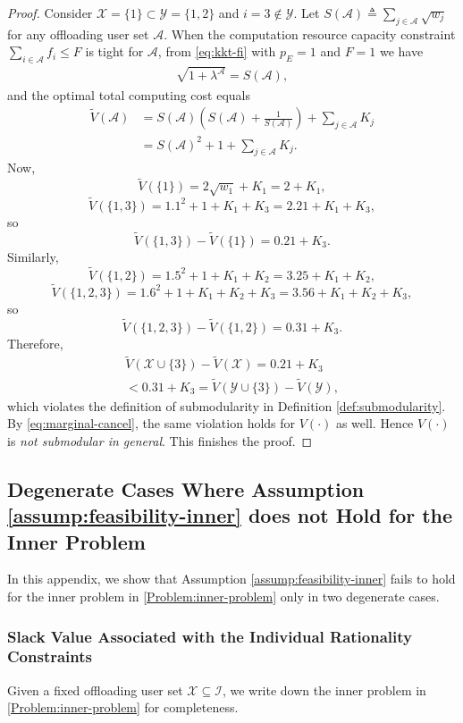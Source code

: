 \documentclass[lettersize,journal]{IEEEtran}
\begin{document}
\begin{proof}
Consider $\mathcal{X}=\{1\}\subset \mathcal{Y}=\{1,2\}$ and $i=3\notin \mathcal{Y}$.
Let $S(\mathcal{A})\triangleq \sum_{j\in\mathcal{A}}\sqrt{w_j}$ for any offloading user set $\mathcal{A}$.
When the computation resource capacity constraint $\sum_{i\in\mathcal{A}}f_i\le F$ is tight for $\mathcal{A}$, from \eqref{eq:kkt-fi} with $p_E=1$ and $F=1$ we have
\begin{align}
\sqrt{1+\lambda^{\mathcal{A}}}=S(\mathcal{A}),
\label{eq:lambda-tight}
\end{align}
and the optimal total computing cost equals
\begin{align}
\widetilde V(\mathcal{A})
&=
S(\mathcal{A})
\left(
S(\mathcal{A})+\frac{1}{S(\mathcal{A})}
\right)+\sum_{j\in\mathcal{A}}K_j\nonumber\\
&=
S(\mathcal{A})^2+1+\sum_{j\in\mathcal{A}}K_j.
\label{eq:tildeV-tight}
\end{align}
Now,
\[
\widetilde V(\{1\})=2\sqrt{w_1}+K_1=2+K_1,
\]
\[
\widetilde V(\{1,3\})=1.1^2+1+K_1+K_3=2.21+K_1+K_3,
\]
so
\[
\widetilde V(\{1,3\})-\widetilde V(\{1\})=0.21+K_3.
\]
Similarly,
\[
\widetilde V(\{1,2\})=1.5^2+1+K_1+K_2=3.25+K_1+K_2,
\]
\[
\widetilde V(\{1,2,3\})=1.6^2+1+K_1+K_2+K_3=3.56+K_1+K_2+K_3,
\]
so
\[
\widetilde V(\{1,2,3\})-\widetilde V(\{1,2\})=0.31+K_3.
\]
Therefore,
\begin{align}
\widetilde V(\mathcal{X}\cup\{3\})-\widetilde V(\mathcal{X})
=
0.21+K_3\nonumber\\
<
0.31+K_3
=
\widetilde V(\mathcal{Y}\cup\{3\})-\widetilde V(\mathcal{Y}),
\label{eq:not-submod-tilde}
\end{align}
which violates the definition of submodularity in Definition \ref{def:submodularity}. By \eqref{eq:marginal-cancel}, the same violation holds for $V(\cdot)$ as well. Hence $V(\cdot)$ is \emph{not submodular in general}.
This finishes the proof.
\end{proof}

\subsection{Degenerate Cases Where Assumption \ref{assump:feasibility-inner} does not Hold for the Inner Problem}\label{app:slater}
In this appendix, we show that Assumption \ref{assump:feasibility-inner} fails to hold for the inner problem in \eqref{Problem:inner-problem} only in two degenerate cases.

\subsubsection{Slack Value Associated with the Individual Rationality Constraints}
Given a fixed offloading user set $\mathcal{X}\subseteq\mathcal{I}$, we write down the inner problem in \eqref{Problem:inner-problem} for completeness.
\end{document}
